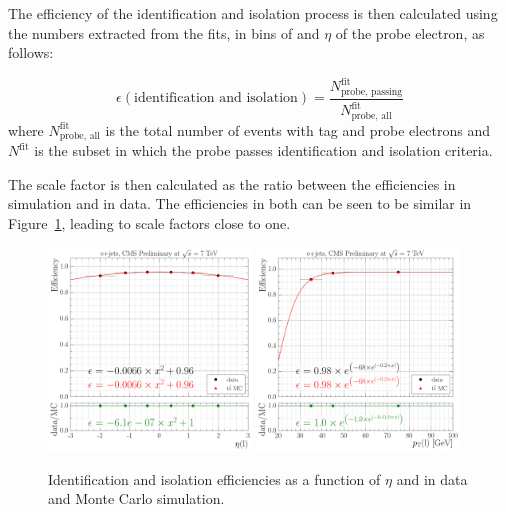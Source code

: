 The efficiency of the identification and isolation process is then calculated using the numbers extracted
from the fits, in bins of \pt and $\eta$ of the probe electron, as follows:

\begin{equation}
\epsilon(\text{identification and isolation}) = \frac{N^{\text{fit}}_{\text{probe, passing}}}{N^{\text{fit}}_{\text{probe, all}}}
\end{equation}
where $N^{\text{fit}}_{\text{probe, all}}$ is the total number of events with tag and probe electrons and
$N^{\text{fit}}$ is the subset in which the probe passes identification and isolation criteria.

The scale factor is then calculated as the ratio between the efficiencies in simulation and in data. The
efficiencies in both can be seen to be similar in Figure~\ref{fig:electron_id_iso_efficiencies_wrt_eta_pt},
leading to scale factors close to one.

\begin{figure}[hbtp]
    \centering
      \includegraphics[width=0.48\textwidth]{Chapters/04_Analysis/04b_XSections/images/lepton_scale_factors/CBConvolution/electron/efficiency_eta_id_iso}\hfill
      \includegraphics[width=0.48\textwidth]{Chapters/04_Analysis/04b_XSections/images/lepton_scale_factors/CBConvolution/electron/efficiency_pt_id_iso}
      \caption[Identification and isolation efficiencies as a function of $\eta$ and \pt in data and \ttbar
      Monte Carlo simulation.]{Identification and isolation efficiencies as a function of $\eta$ and \pt in data and \ttbar
      Monte Carlo simulation.}
     \label{fig:electron_id_iso_efficiencies_wrt_eta_pt}
\end{figure}

